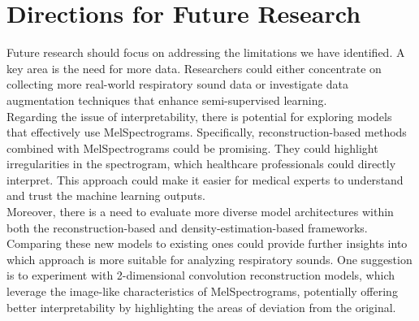 \section{Directions for Future Research}
Future research should focus on addressing the limitations we have identified. A key area is the need for more data. Researchers could either concentrate on collecting more real-world respiratory sound data or investigate data augmentation techniques that enhance semi-supervised learning.\\
Regarding the issue of interpretability, there is potential for exploring models that effectively use MelSpectrograms. Specifically, reconstruction-based methods combined with MelSpectrograms could be promising. They could highlight irregularities in the spectrogram, which healthcare professionals could directly interpret. This approach could make it easier for medical experts to understand and trust the machine learning outputs.\\
Moreover, there is a need to evaluate more diverse model architectures within both the reconstruction-based and density-estimation-based frameworks. Comparing these new models to existing ones could provide further insights into which approach is more suitable for analyzing respiratory sounds. One suggestion is to experiment with 2-dimensional convolution reconstruction models, which leverage the image-like characteristics of MelSpectrograms, potentially offering better interpretability by highlighting the areas of deviation from the original.

